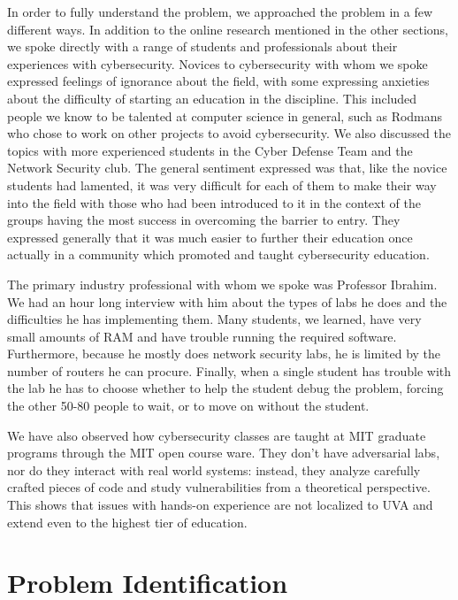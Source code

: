 \documentclass[openright]{report}
\begin{document}
\par In order to fully understand the problem, we approached the problem in a few different ways. In addition to the online research mentioned in the other sections, we spoke directly with a range of students and professionals about their experiences with cybersecurity. Novices to cybersecurity with whom we spoke expressed feelings of ignorance about the field, with some expressing anxieties about the difficulty of starting an education in the discipline. This included people we know to be talented at computer science in general, such as Rodmans who chose to work on other projects to avoid cybersecurity. We also discussed the topics with more experienced students in the Cyber Defense Team and the Network Security club. The general sentiment expressed was that, like the novice students had lamented, it was very difficult for each of them to make their way into the field with those who had been introduced to it in the context of the groups having the most success in overcoming the barrier to entry. They expressed generally that it was much easier to further their education once actually in a community which promoted and taught cybersecurity education. 

\par The primary industry professional with whom we spoke was Professor Ibrahim. We had an hour long interview with him about the types of labs he does and the difficulties he has implementing them. Many students, we learned, have very small amounts of RAM and have trouble running the required software. Furthermore, because he mostly does network security labs, he is limited by the number of routers he can procure. Finally, when a single student has trouble with the lab he has to choose whether to help the student debug the problem, forcing the other 50-80 people to wait, or to move on without the student\cite{ibrahiminterview}.

\par We have also observed how cybersecurity classes are taught at MIT graduate programs through the MIT open course ware. They don't have adversarial labs, nor do they interact with real world systems: instead, they analyze carefully crafted pieces of code and study vulnerabilities from a theoretical perspective. This shows that issues with hands-on experience are not localized to UVA and extend even to the highest tier of education\cite{mit}.

\section{Problem Identification}
\end{document}
